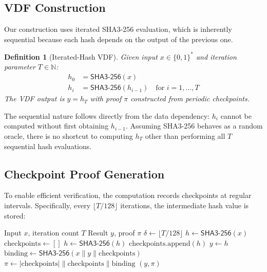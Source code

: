 \documentclass[conference,10pt]{IEEEtran}
\newtheorem{definition}[theorem]{Definition}
\newcommand{\SHAthree}{\textsf{SHA3-256}}
\begin{document}
\subsection{VDF Construction}

Our construction uses iterated SHA3-256 evaluation, which is inherently sequential because each hash depends on the output of the previous one.

\begin{definition}[Iterated-Hash VDF]
\label{def:vdf}
Given input $x \in \{0,1\}^*$ and iteration parameter $T \in \mathbb{N}$:
\begin{align}
  h_0 &= \SHAthree{}(x) \label{eq:vdf_base} \\
  h_i &= \SHAthree{}(h_{i-1}) \quad \text{for } i = 1, \ldots, T \label{eq:vdf_iter}
\end{align}
The VDF output is $y = h_T$ with proof $\pi$ constructed from periodic checkpoints.
\end{definition}

The sequential nature follows directly from the data dependency: $h_i$ cannot be computed without first obtaining $h_{i-1}$. Assuming SHA3-256 behaves as a random oracle, there is no shortcut to computing $h_T$ other than performing all $T$ sequential hash evaluations.

\subsection{Checkpoint Proof Generation}

To enable efficient verification, the computation records checkpoints at regular intervals. Specifically, every $\lfloor T/128 \rfloor$ iterations, the intermediate hash value is stored:

\begin{algorithm}[t]
\caption{VDF Computation with Checkpoint Proofs}
\label{alg:vdf_compute}
\begin{algorithmic}[1]
\REQUIRE Input $x$, iteration count $T$
\ENSURE Result $y$, proof $\pi$
\STATE $\delta \gets \lfloor T / 128 \rfloor$ 
\STATE $h \gets \SHAthree{}(x)$ 
\STATE $\text{checkpoints} \gets []$
  \STATE $h \gets \SHAthree{}(h)$
    \STATE $\text{checkpoints.append}(h)$
  \ENDIF
\ENDFOR
\STATE $y \gets h$ 
\STATE $\text{binding} \gets \SHAthree{}(x \| y \| \text{checkpoints})$
\STATE $\pi \gets |\text{checkpoints}| \| \text{checkpoints} \| \text{binding}$
\RETURN $(y, \pi)$
\end{algorithmic}
\end{algorithm}
\end{document}
